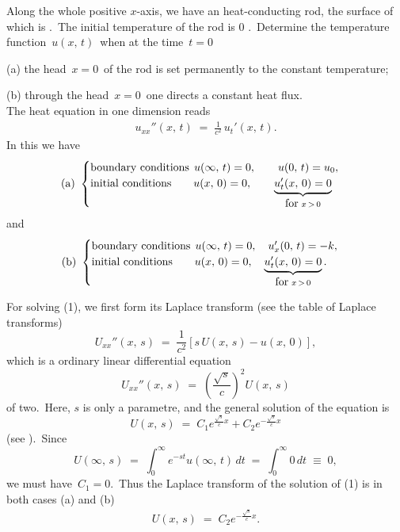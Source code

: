 \documentclass[12pt]{article}
\theoremstyle{definition}
\begin{document}
Along the whole positive $x$-axis, we have an  heat-conducting rod, the surface of which is .\, The initial temperature of the rod is 0 .\, Determine the temperature function 
\,$u(x,\,t)$\, when at the time \,$t = 0$
 
(a) the head \,$x = 0$\, of the rod is set permanently to the constant temperature;

(b) through the head \,$x = 0$\, one directs a constant heat flux.\\


The heat equation in one dimension reads
\begin{align}
u_{xx}''(x,\,t) \;=\; \frac{1}{c^2}\,u_t'(x,\,t).
\end{align}
In this we have
\begin{align*}
\mbox{(a) }
\begin{cases}
\mbox{boundary conditions}\;\, u(\infty,\,t) = 0, \qquad u(0,\,t) = u_0, \\
\mbox{initial conditions} \qquad u(x,\,0) = 0, \qquad \underbrace{u_t'(x,\,0) = 0}_{\mbox{for\;} x\,>\,0} 
\end{cases}
\end{align*}
and
\begin{align*}
\mbox{(b) }
\begin{cases}
\mbox{boundary conditions}\;\, u(\infty,\,t) = 0, \quad u_x'(0,\,t) = -k, \\
\mbox{initial conditions} \qquad u(x,\,0) = 0, \quad \underbrace{u_t'(x,\,0) = 0}_{\mbox{for\;} x\,>\,0}. 
\end{cases}
\end{align*}

For solving (1), we first form its Laplace transform (see the table of Laplace transforms)
$$U_{xx}''(x,\,s) \;=\; \frac{1}{c^2}[s\,U(x,\,s)-u(x,\,0)],$$
which is a  ordinary linear differential equation
$$U_{xx}''(x,\,s) \;=\; \left(\frac{\sqrt{s}}{c}\right)^2U(x,\,s)$$
of  two.\, Here, $s$ is only a parametre, and the general solution of the equation is 
$$U(x,\,s) \;=\; C_1e^{\frac{\sqrt{s}}{c}x}+C_2e^{-\frac{\sqrt{s}}{c}x}$$
(see ).\, Since 
$$U(\infty,\,s) \;=\; \int_0^\infty\!e^{-st}u(\infty,\,t)\,dt \;=\;\int_0^\infty\!0\,dt \;\equiv\; 0,$$
we must have\, $C_1 = 0$.\, Thus the Laplace transform of the solution of (1) is in both cases (a) and (b)
\begin{align}
U(x,\,s) \;=\; C_2e^{-\frac{\sqrt{s}}{c}x}.
\end{align}
\end{document}
